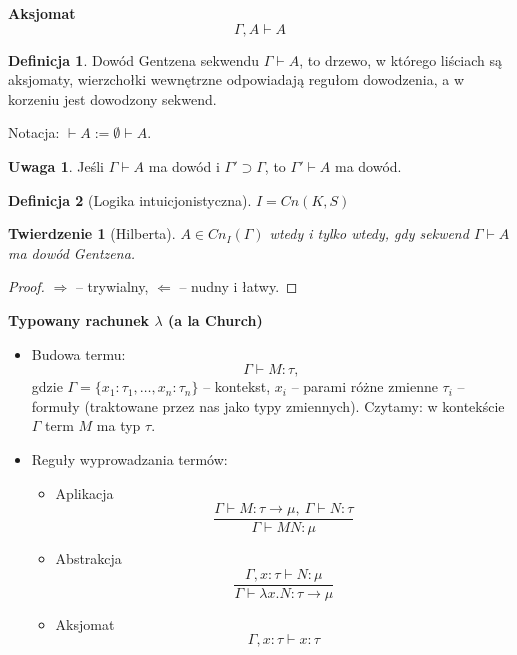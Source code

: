 \documentclass[10pt,a4paper]{article}
\theoremstyle{plain}
\newtheorem{theorem}{Twierdzenie}
\theoremstyle{definition}
\newtheorem*{definition}{Definicja}
\newtheorem*{remark}{Uwaga}
\newcommand{\impl}{\rightarrow}
\newcommand{\header}[1]{\noindent\textbf{#1}}
\begin{document}
\header{Aksjomat}
$$\Gamma, A \vdash A$$

\begin{definition}
Dowód Gentzena sekwendu $\Gamma \vdash A$, to drzewo, w którego liściach są
aksjomaty, wierzchołki wewnętrzne odpowiadają regułom dowodzenia, a w korzeniu
jest dowodzony sekwend.
\end{definition}

\noindent Notacja: $\vdash A := \emptyset \vdash A$.

\begin{remark}
Jeśli $\Gamma \vdash A$ ma dowód i $\Gamma' \supset \Gamma$, to
$\Gamma' \vdash A$ ma dowód.
\end{remark}


\begin{definition}[Logika intuicjonistyczna]
$I = Cn(K, S)$
\end{definition}

\begin{theorem}[Hilberta]
$A \in Cn_I(\Gamma)$ wtedy i tylko wtedy, gdy sekwend $\Gamma \vdash A$ ma
dowód Gentzena.
\end{theorem}

\begin{proof}
$\Rightarrow$ -- trywialny, $\Leftarrow$ -- nudny i łatwy.
\end{proof}

\header{Typowany rachunek $\lambda$ (a la Church)}
\begin{itemize}
  \item Budowa termu:
    $$\Gamma \vdash M:\tau,$$
    gdzie $\Gamma = \{x_1:\tau_1, \ldots, x_n:\tau_n\}$ -- kontekst,
    $x_i$ -- parami różne zmienne
    $\tau_i$ -- formuły (traktowane przez nas jako typy zmiennych).
    Czytamy: w kontekście $\Gamma$ term $M$ ma typ $\tau$.
  \item Reguły wyprowadzania termów:
    \begin{itemize}
      \item Aplikacja
        $$\frac{
          \Gamma \vdash M : \tau \impl \mu, \ \Gamma \vdash N : \tau
        }{
          \Gamma \vdash MN : \mu
        }$$
      \item Abstrakcja
        $$\frac{
          \Gamma, x:\tau \vdash N : \mu
        }{
          \Gamma \vdash \lambda x . N : \tau \impl \mu
        }$$
      \item Aksjomat
        $$\Gamma, x:\tau \vdash x:\tau$$
    \end{itemize}
\end{itemize}
\end{document}
